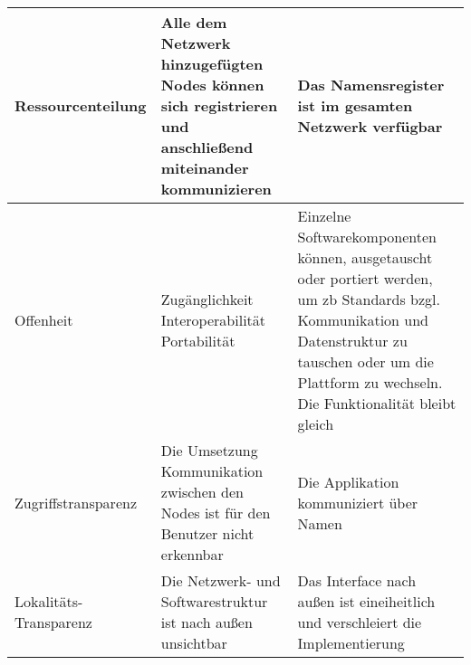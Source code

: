 \begin{longtable}{|>{\raggedright\arraybackslash}p{4cm}|>{\raggedright\arraybackslash}p{5cm}|>{\raggedright\arraybackslash}p{5cm}|}
	Ressourcenteilung  & Alle dem Netzwerk hinzugefügten Nodes können sich registrieren und anschließend miteinander kommunizieren & Das Namensregister ist im gesamten Netzwerk verfügbar\\
	\hline
	Offenheit & 
	\parbox[t]{5cm}{Zugänglichkeit\\Interoperabilität\\Portabilität} 
	& Einzelne Softwarekomponenten können, ausgetauscht oder portiert werden, um zb Standards bzgl. Kommunikation und Datenstruktur zu tauschen oder um die Plattform zu wechseln. Die Funktionalität bleibt gleich\\
	\hline
	Zugriffstransparenz & Die Umsetzung Kommunikation zwischen den Nodes ist für den Benutzer nicht erkennbar & Die Applikation kommuniziert über Namen\\
	\hline
	Lokalitäts-Transparenz  & Die Netzwerk- und Softwarestruktur ist nach außen unsichtbar  & Das Interface nach außen ist eineiheitlich und verschleiert die Implementierung\\
	
	
	
\end{longtable}
\clearpage
